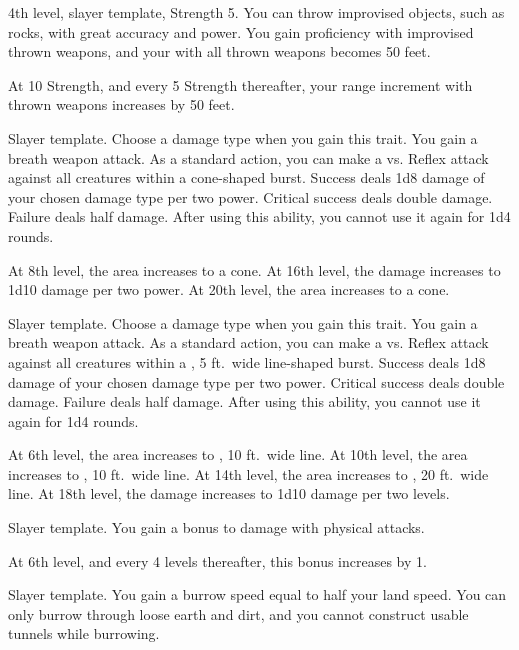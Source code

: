     \featpre 4th level, slayer template, Strength 5.
    \featben You can throw improvised objects, such as rocks, with great accuracy and power.
    You gain proficiency with improvised thrown weapons, and your  with all thrown weapons becomes 50 feet.

    At 10 Strength, and every 5 Strength thereafter, your range increment with thrown weapons increases by 50 feet.

    \featpre Slayer template.
     Choose a damage type when you gain this trait.
    \featben You gain a breath weapon attack.
    As a standard action, you can make a  vs. Reflex attack against all creatures within a \areamed cone-shaped burst.
    Success deals 1d8 damage of your chosen damage type per two power.
    Critical success deals double damage.
    Failure deals half damage.
    After using this ability, you cannot use it again for 1d4 rounds.

    At 8th level, the area increases to a \arealarge cone.
    At 16th level, the damage increases to 1d10 damage per two power.
    At 20th level, the area increases to a \areahuge cone.

    \featpre Slayer template.
     Choose a damage type when you gain this trait.
    \featben You gain a breath weapon attack.
    As a standard action, you can make a  vs. Reflex attack against all creatures within a \arealarge, 5 ft.\ wide line-shaped burst.
    Success deals 1d8 damage of your chosen damage type per two power.
    Critical success deals double damage.
    Failure deals half damage.
    After using this ability, you cannot use it again for 1d4 rounds.

    At 6th level, the area increases to \arealarge, 10 ft.\ wide line.
    At 10th level, the area increases to \areahuge, 10 ft.\ wide line.
    At 14th level, the area increases to \areahuge, 20 ft.\ wide line.
    At 18th level, the damage increases to 1d10 damage per two levels.

    \featpre Slayer template.
    \featben You gain a  bonus to damage with physical attacks.

    At 6th level, and every 4 levels thereafter, this bonus increases by 1.

    \featpre Slayer template.
    \featben You gain a burrow speed equal to half your land speed.
    You can only burrow through loose earth and dirt, and you cannot construct usable tunnels while burrowing.

